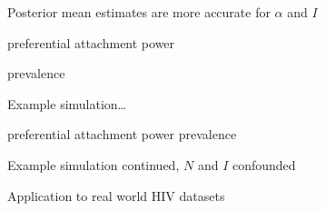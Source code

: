 \documentclass{beamer}
\newcommand{\tablepath}{../tables}
\begin{document}
\begin{frame}{Posterior mean estimates are more accurate for $\alpha$ and $I$}
  \begin{minipage}[p][\textheight][t]{\textwidth}
    \vspace{-0.5cm}
    preferential attachment power \hfill {}

    \hspace{0.75cm}

    prevalence \hfill {}
  \end{minipage}
\end{frame}

\begin{frame}{Example simulation\ldots}
  \begin{minipage}[p][\textheight][t]{\textwidth}
    \begin{center}
    preferential attachment power \hfill prevalence
    \end{center}
  \end{minipage}
\end{frame}

\begin{frame}{Example simulation continued, $N$ and $I$ confounded}
\end{frame}

\begin{frame}{Application to real world HIV datasets}
  \centerline{}
\end{frame}
\end{document}
